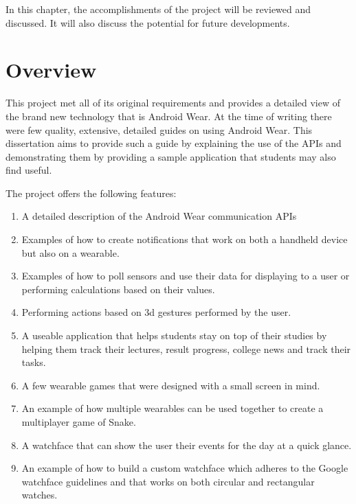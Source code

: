 In this chapter, the accomplishments of the project will be reviewed and
discussed. It will also discuss the potential for future developments.

\section{Overview}

This project met all of its original requirements and provides a detailed view
of the brand new technology that is Android Wear. At the time of writing there
were few quality, extensive, detailed guides on using Android Wear. This
dissertation aims to provide such a guide by explaining the use of the APIs and
demonstrating them by providing a sample application that students may also find
useful.

The project offers the following features:
\begin{enumerate}
\item A detailed description of the Android Wear communication APIs
\item Examples of how to create notifications that work on both a handheld
    device but also on a wearable.
\item Examples of how to poll sensors and use their data for displaying to 
    a user or performing calculations based on their values.
\item Performing actions based on 3d gestures performed by the user.
\item A useable application that helps students stay on top of their studies
    by helping them track their lectures, result progress, college news and
    track their tasks.
\item A few wearable games that were designed with a small screen in mind.
\item An example of how multiple wearables can be used together to create a 
    multiplayer game of Snake.
\item A watchface that can show the user their events for the day at a quick
    glance.
\item An example of how to build a custom watchface which adheres to the Google
    watchface guidelines and that works on both circular and rectangular
    watches.
\end{enumerate}

